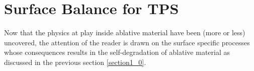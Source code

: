 \documentclass[english,10pt,a4paper,oneside,twocolumn,titlepage]{report}
\begin{document}
	\section{Surface Balance for TPS}
	\label{section2_0}
	Now that the physics at play inside ablative material have
	been (more or less) uncovered, the attention of the 
	reader is drawn on the surface specific processes whose 
	consequences results in the self-degradation of ablative
	material as discussed in the previous section 
	\ref{section1_0}.

	\pagebreak
	\appendix

	
	
	
	
	
\end{document}
